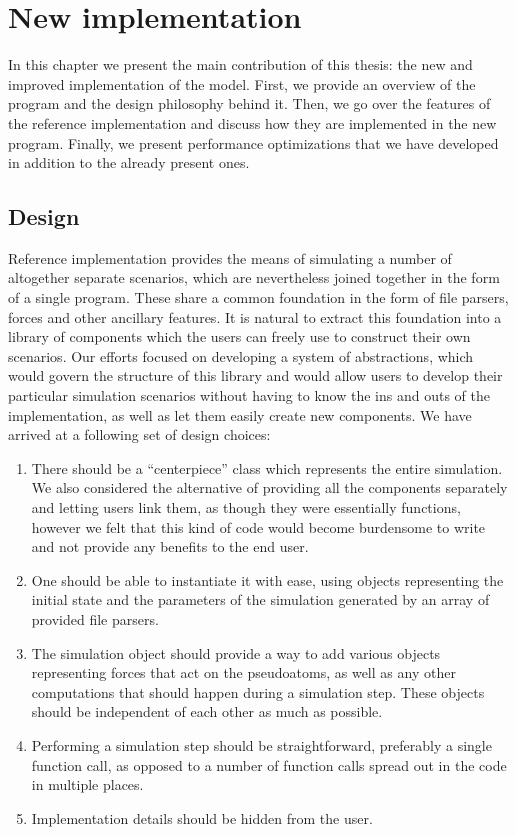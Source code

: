 \chapter{New implementation}\label{c:new_impl}

In this chapter we present the main contribution of this thesis: the new and improved implementation of the model. First, we provide an overview of the program and the design philosophy behind it. Then, we go over the features of the reference implementation and discuss how they are implemented in the new program. Finally, we present performance optimizations that we have developed in addition to the already present ones.

\section{Design}\label{new:design}

Reference implementation provides the means of simulating a number of altogether separate scenarios, which are nevertheless joined together in the form of a single program. These share a common foundation in the form of file parsers, forces and other ancillary features. It is natural to extract this foundation into a library of components which the users can freely use to construct their own scenarios. Our efforts focused on developing a system of abstractions, which would govern the structure of this library and would allow users to develop their particular simulation scenarios without having to know the ins and outs of the implementation, as well as let them easily create new components. We have arrived at a following set of design choices:

\begin{enumerate}
    \item There should be a ``centerpiece'' class which represents the entire simulation. We also considered the alternative of providing all the components separately and letting users link them, as though they were essentially functions, however we felt that this kind of code would become burdensome to write and not provide any benefits to the end user.
    \item One should be able to instantiate it with ease, using objects representing the initial state and the parameters of the simulation generated by an array of provided file parsers.
    \item The simulation object should provide a way to add various objects representing forces that act on the pseudoatoms, as well as any other computations that should happen during a simulation step. These objects should be independent of each other as much as possible.
    \item Performing a simulation step should be straightforward, preferably a single function call, as opposed to a number of function calls spread out in the code in multiple places.
    \item Implementation details should be hidden from the user.
\end{enumerate}

